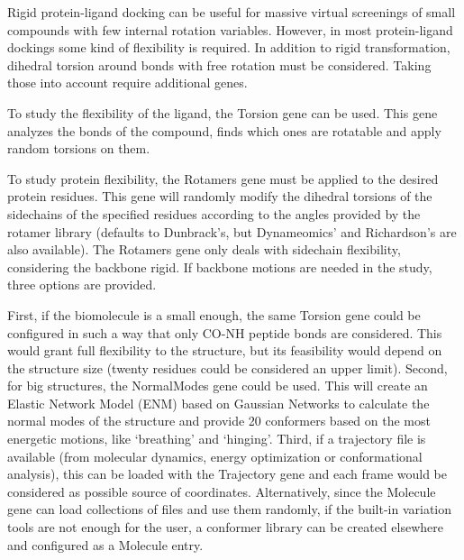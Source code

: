 Rigid protein-ligand docking can be useful for massive virtual screenings of small compounds with few internal rotation variables. However, in most protein-ligand dockings some kind of flexibility is required. In addition to rigid transformation, dihedral torsion around bonds with free rotation must be considered. Taking those into account require additional genes.

To study the flexibility of the ligand, the Torsion gene can be used. This gene analyzes the bonds of the compound, finds which ones are rotatable and apply random torsions on them.

To study protein flexibility, the Rotamers gene must be applied to the desired protein residues. This gene will randomly modify the dihedral torsions of the sidechains of the specified residues according to the angles provided by the rotamer library (defaults to Dunbrack’s,\cite{dunbrack1993backbone} but Dynameomics'\cite{scouras2011dynameomics} and Richardson’s\cite{lovell2000penultimate} are also available). The Rotamers gene only deals with sidechain flexibility, considering the backbone rigid. If backbone motions are needed in the study, three options are provided.

First, if the biomolecule is a small enough, the same Torsion gene could be configured in such a way that only CO-NH peptide bonds are considered. This would grant full flexibility to the structure, but its feasibility would depend on the structure size (twenty residues could be considered an upper limit). Second, for big structures, the NormalModes gene could be used. This will create an Elastic Network Model (ENM) based on Gaussian Networks to calculate the normal modes of the structure and provide 20 conformers based on the most energetic motions, like ‘breathing’ and ‘hinging’. Third, if a trajectory file is available (from molecular dynamics, energy optimization or conformational analysis), this can be loaded with the Trajectory gene and each frame would be considered as possible source of coordinates. Alternatively, since the Molecule gene can load collections of files and use them randomly, if the built-in variation tools are not enough for the user, a conformer library can be created elsewhere and configured as a Molecule entry.

